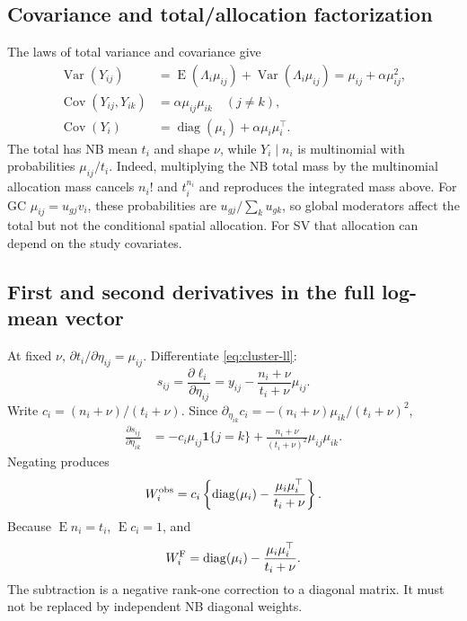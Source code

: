 \documentclass[11pt,a4paper]{article}
\newcommand{\E}{\operatorname{E}}
\newcommand{\Var}{\operatorname{Var}}
\newcommand{\Cov}{\operatorname{Cov}}
\newcommand{\diag}{\operatorname{diag}}
\numberwithin{equation}{section}
\begin{document}
\subsection{Covariance and total/allocation factorization}
The laws of total variance and covariance give
\begin{align}
 \Var(Y_{ij})
 &=\E(\Lambda_i\mu_{ij})+\Var(\Lambda_i\mu_{ij})
     =\mu_{ij}+\alpha\mu_{ij}^2,\\
 \Cov(Y_{ij},Y_{ik})&=\alpha\mu_{ij}\mu_{ik}\quad(j\ne k),\\
 \Cov(Y_i)&=\diag(\mu_i)+\alpha\mu_i\mu_i^\top.
\end{align}
The total has NB mean $t_i$ and shape $\nu$, while
$Y_i\mid n_i$ is multinomial with probabilities $\mu_{ij}/t_i$.
Indeed, multiplying the NB total mass by the multinomial allocation mass
cancels $n_i!$ and $t_i^{n_i}$ and reproduces the integrated mass above.
For GC $\mu_{ij}=u_{gj}v_i$, these probabilities are
$u_{gj}/\sum_k u_{gk}$, so global moderators affect the total but not
the conditional spatial allocation.
For SV that allocation can depend on the study covariates.

\subsection{First and second derivatives in the full log-mean vector}
At fixed $\nu$,
$\partial t_i/\partial\eta_{ij}=\mu_{ij}$.
Differentiate \eqref{eq:cluster-ll}:
\begin{equation}
 s_{ij}=\frac{\partial\ell_i}{\partial\eta_{ij}}
       =y_{ij}-\frac{n_i+\nu}{t_i+\nu}\mu_{ij}.
 \label{eq:cluster-score}
\end{equation}
Write $c_i=(n_i+\nu)/(t_i+\nu)$.
Since
$\partial_{\eta_{ik}}c_i=-(n_i+\nu)\mu_{ik}/(t_i+\nu)^2$,
\begin{align}
 \frac{\partial s_{ij}}{\partial\eta_{ik}}
 &=-c_i\mu_{ij}\mathbf1\{j=k\}
     +\frac{n_i+\nu}{(t_i+\nu)^2}\mu_{ij}\mu_{ik}.
\end{align}
Negating produces
\begin{equation}\label{eq:cluster-local}
 W_i^{\rm obs}
 =c_i\left\{\diag(\mu_i)-\frac{\mu_i\mu_i^\top}{t_i+\nu}\right\}.
\end{equation}
Because $\E n_i=t_i$, $\E c_i=1$, and
\begin{equation}
 W_i^{\rm F}=\diag(\mu_i)-\frac{\mu_i\mu_i^\top}{t_i+\nu}.
\end{equation}
The subtraction is a negative rank-one correction to a diagonal matrix.
It must not be replaced by independent NB diagonal weights.
\end{document}
